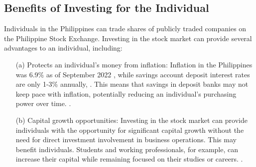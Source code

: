 \subsection{Benefits of Investing for the Individual}
Individuals in the Philippines can trade shares of publicly traded 
companies on the Philippine Stock Exchange. Investing in the stock market 
can provide several advantages to an individual, including:
\begin{itemize}
    \item[(a)] Protects an individual's money from inflation: Inflation in the 
    Philippines was 6.9\% as of September 2022
    \cite{tradingEconomics}, 
    while savings account deposit interest rates are only 1-3\% annually, 
    \cite{BSP19}. 
    This means that savings in deposit banks may not keep pace with inflation, 
    potentially reducing an individual's purchasing power over time.
    \cite{RBC, EdwardJones}.
    \item[(b)] Capital growth opportunities: Investing in the stock market can 
    provide individuals with the opportunity for significant capital growth 
    without the need for direct investment involvement in business operations. 
    This may benefit individuals. Students and working professionals, for example, 
    can increase their capital while remaining focused on their studies or careers.
    \cite{USSecAndExComm}.
\end{itemize}